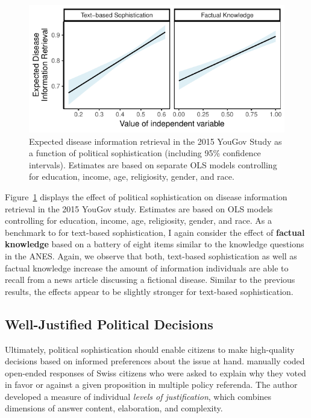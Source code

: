 \documentclass[12pt]{article}
\begin{document}
\begin{figure}[h]\centering
\includegraphics{../fig/yg_disease.pdf}
\caption{Expected disease information retrieval in the 2015 YouGov Study as a function of political sophistication (including 95\% confidence intervals). Estimates are based on separate OLS models controlling for education, income, age, religiosity, gender, and race.}\label{fig:yg_corplot}
\end{figure}

Figure~\ref{fig:yg_corplot} displays the effect of political sophistication on disease information retrieval in the 2015 YouGov study. Estimates are based on OLS models controlling for education, income, age, religiosity, gender, and race. As a benchmark to for text-based sophistication, I again consider the effect of \textbf{factual knowledge} based on a battery of eight items similar to the knowledge questions in the ANES. Again, we observe that both, text-based sophistication as well as factual knowledge increase the amount of information individuals are able to recall from a news article discussing a fictional disease. Similar to the previous results, the effects appear to be slightly stronger for text-based sophistication.


\subsection*{Well-Justified Political Decisions}

Ultimately, political sophistication should enable citizens to make high-quality decisions based on informed preferences about the issue at hand. \citet{colombo2016justifications} manually coded open-ended responses of Swiss citizens who were asked to explain why they voted in favor or against a given proposition in multiple policy referenda. The author developed a measure of individual \textit{levels of justification}, which combines dimensions of answer content, elaboration, and complexity.
\end{document}
